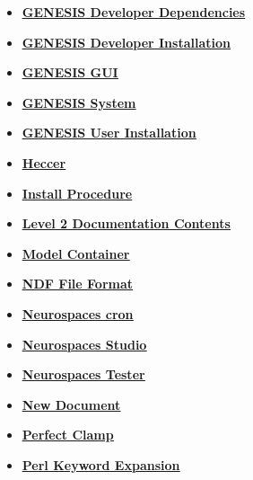 \documentclass[12pt]{article}
\begin{document}
\begin{itemize}
\item \href{../genesis-dependencies/genesis-dependencies.pdf}{\bf \underline{GENESIS Developer Dependencies}}

\item \href{../installation-developer/installation-developer.pdf}{\bf \underline{GENESIS Developer Installation}}

\item \href{../gui/gui.pdf}{\bf \underline{GENESIS GUI}}

\item \href{../genesis-system/genesis-system.pdf}{\bf \underline{GENESIS System}}

\item \href{../installation-user/installation-user.pdf}{\bf \underline{GENESIS User Installation}}

\item \href{../heccer/heccer.pdf}{\bf \underline{Heccer}}

\item \href{../install-procedure/install-procedure.pdf}{\bf \underline{Install Procedure}}

\item \href{../contents-level2/contents-level2.pdf}{\bf \underline{Level 2 Documentation Contents}}

\item \href{../model-container/model-container.pdf}{\bf \underline{Model Container}}

\item \href{../ndf-file-format/ndf-file-format.pdf}{\bf \underline{NDF File Format}}

\item \href{../neurospaces-cron/neurospaces-cron.pdf}{\bf \underline{Neurospaces cron}}

\item \href{../studio/studio.pdf}{\bf \underline{Neurospaces Studio}}

\item \href{../neurospaces-tester/neurospaces-tester.pdf}{\bf \underline{Neurospaces Tester}}

\item \href{../NewDocument/NewDocument.pdf}{\bf \underline{New Document}}

\item \href{../pclamp/pclamp.pdf}{\bf \underline{Perfect Clamp}}

\item \href{../release-expand/release-expand.pdf}{\bf \underline{Perl Keyword Expansion}}


\end{itemize}
\end{document}
